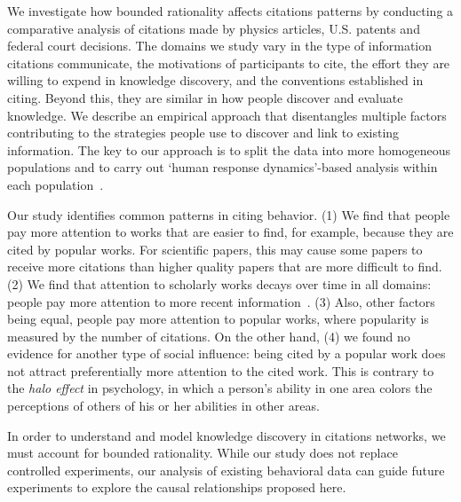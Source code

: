 \documentclass[10pt]{bmc_article}
\newenvironment{bmcformat}{\baselineskip20pt\sloppy\setboolean{publ}{false}}{\baselineskip20pt\sloppy}
\begin{document}
\begin{bmcformat}
We investigate how bounded rationality affects citations patterns by conducting a comparative analysis of citations made by physics articles, U.S. patents and federal court decisions. The domains we study vary in the type of information citations communicate, the motivations of participants to cite, the effort they are willing to expend in knowledge discovery, and the conventions established in citing. Beyond this, they are similar in how people discover and evaluate knowledge. We describe an empirical approach that disentangles multiple factors contributing to the strategies people use to discover and link to existing information. The key to our approach is to split the data into %
more homogeneous populations %
and to carry out `human response dynamics'-based analysis within each population~\cite{Hodas12socialcom}.


Our study identifies common patterns in citing behavior. (1) We find that people pay more attention to works that are easier to find, for example, because they are cited by popular works. %
For scientific papers, this may cause some papers to receive more citations than higher quality papers that are more difficult to find.
(2) We find that attention to scholarly works decays over time in all domains: people pay more attention to more recent information~\cite{Barabasi13}.
(3) Also, other factors being equal, people pay more attention to popular works, where popularity is measured by the number of citations.
On the other hand, (4) we  found no evidence for another type of social influence: being cited by a popular work does not attract preferentially more attention to the cited work. This is contrary to the \emph{halo effect} in psychology, in which a person's ability in one area colors the perceptions of others of his or her abilities in other areas.


In order to understand and model knowledge discovery in citations networks, we must account for bounded rationality.
While our study does not replace controlled experiments, our analysis of existing behavioral data can guide future experiments to explore the causal relationships proposed here.



\end{bmcformat}
\end{document}

